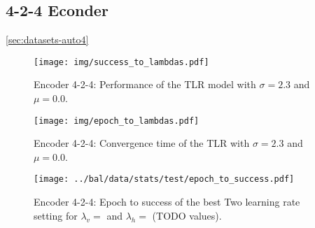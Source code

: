 
\subsection{4-2-4 Econder} 
\label{sec:tlr-auto4} 

\ref{sec:datasets-auto4} 
\begin{figure}[t]
  \centering
  \texttt{[image: img/success\_to\_lambdas.pdf]}    
  \caption{Encoder 4-2-4: Performance of the TLR model with $\sigma = 2.3$ and $\mu = 0.0$.}
  \label{fig:results-two-lambdas-auto4-success}
\end{figure}

\begin{figure}[t]
  \centering
  \texttt{[image: img/epoch\_to\_lambdas.pdf]}    
  \caption{Encoder 4-2-4: Convergence time of the TLR with $\sigma = 2.3$ and $\mu = 0.0$.}
  \label{fig:results-two-lambdas-auto4-epoch}
\end{figure}

\begin{figure}[t]
  \centering
  \texttt{[image: ../bal/data/stats/test/epoch\_to\_success.pdf]}    
  \caption{Encoder 4-2-4: Epoch to success of the best Two learning rate setting for $\lambda_v = $ and $\lambda_h=$ (TODO values).}
  \label{fig:results-two-lambdas-auto4-s2e} 
\end{figure}
